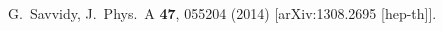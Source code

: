 \documentclass[10pt,a4paper]{article}
\begin{document}



\newpage

\begin{thebibliography}{alp}

  G.~Savvidy,
  J.\ Phys.\ A {\bf 47}, 055204 (2014)
  [arXiv:1308.2695 [hep-th]].

\end{thebibliography}
\end{document}
